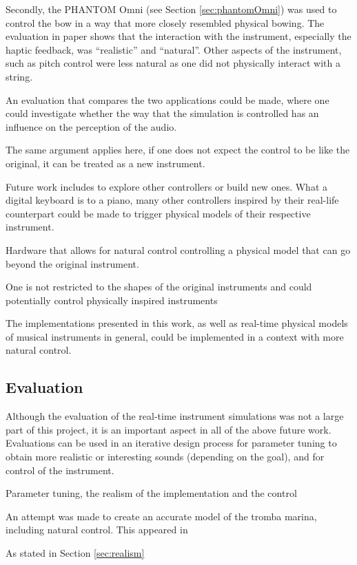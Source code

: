 Secondly, the PHANTOM Omni (see Section \ref{sec:phantomOmni}) was used to control the bow in a way that more closely resembled physical bowing. The evaluation in paper \citeP[E] shows that the interaction with the instrument, especially the haptic feedback, was ``realistic'' and ``natural''. Other aspects of the instrument, such as pitch control were less natural as one did not physically interact with a string. 


An evaluation that compares the two applications could be made, where one could investigate whether the way that the simulation is controlled has an influence on the perception of the audio. 

The same argument applies here, if one does not expect the control to be like the original, it can be treated as a new instrument.



Future work includes to explore other controllers or build new ones. What a digital keyboard is to a piano, many other controllers inspired by their real-life counterpart could be made to trigger physical models of their respective instrument.


Hardware that allows for natural control controlling a physical model that can go beyond the original instrument. 

One is not restricted to the shapes of the original instruments and could potentially control physically inspired instruments 

The implementations presented in this work, as well as real-time physical models of musical instruments in general, could be implemented in a context with more natural control. 

\subsection{Evaluation}
Although the evaluation of the real-time instrument simulations was not a large part of this project, it is an important aspect in all of the above future work. Evaluations can be used in an iterative design process for parameter tuning to obtain more realistic or interesting sounds (depending on the goal), and for control of the instrument.

Parameter tuning, the realism of the implementation and the control 

An attempt was made to create an accurate model of the tromba marina, including natural control. This appeared in \citeP[E] 

As stated in Section \ref{sec:realism}

